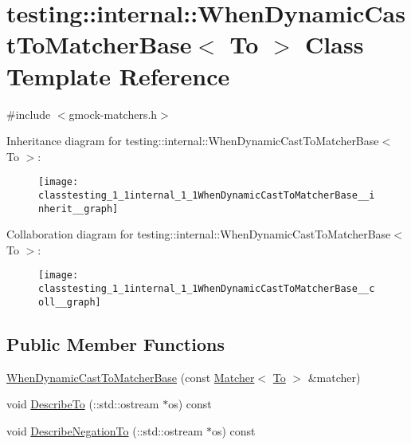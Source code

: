 \hypertarget{classtesting_1_1internal_1_1WhenDynamicCastToMatcherBase}{}\section{testing\+:\+:internal\+:\+:When\+Dynamic\+Cast\+To\+Matcher\+Base$<$ To $>$ Class Template Reference}
\label{classtesting_1_1internal_1_1WhenDynamicCastToMatcherBase}


{\ttfamily \#include $<$gmock-\/matchers.\+h$>$}



Inheritance diagram for testing\+:\+:internal\+:\+:When\+Dynamic\+Cast\+To\+Matcher\+Base$<$ To $>$\+:\nopagebreak
\begin{figure}[H]
\begin{center}
\leavevmode
\texttt{[image: classtesting\_1\_1internal\_1\_1WhenDynamicCastToMatcherBase\_\_inherit\_\_graph]}
\end{center}
\end{figure}


Collaboration diagram for testing\+:\+:internal\+:\+:When\+Dynamic\+Cast\+To\+Matcher\+Base$<$ To $>$\+:\nopagebreak
\begin{figure}[H]
\begin{center}
\leavevmode
\texttt{[image: classtesting\_1\_1internal\_1\_1WhenDynamicCastToMatcherBase\_\_coll\_\_graph]}
\end{center}
\end{figure}
\subsection*{Public Member Functions}
\begin{DoxyCompactItemize}
\item 
\hyperlink{classtesting_1_1internal_1_1WhenDynamicCastToMatcherBase_a7da2a4c7c43d5e18db0a3233a601c8ab}{When\+Dynamic\+Cast\+To\+Matcher\+Base} (const \hyperlink{classtesting_1_1Matcher}{Matcher}$<$ \hyperlink{classtesting_1_1internal_1_1To}{To} $>$ \&matcher)
\item 
void \hyperlink{classtesting_1_1internal_1_1WhenDynamicCastToMatcherBase_ac5726cb7b40862aabecce4d4d9c6f8b1}{Describe\+To} (\+::std\+::ostream $\ast$os) const 
\item 
void \hyperlink{classtesting_1_1internal_1_1WhenDynamicCastToMatcherBase_ac4f1370bc2db15a7242f06ea2e6309c2}{Describe\+Negation\+To} (\+::std\+::ostream $\ast$os) const 
\end{DoxyCompactItemize}

